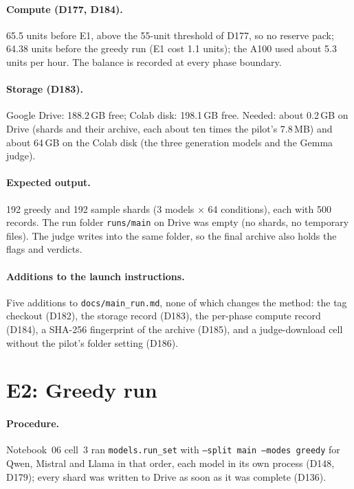 \documentclass[11pt,a4paper]{report}
\begin{document}
\paragraph{Compute (D177, D184).} 65.5 units before E1, above the 55-unit
threshold of D177, so no reserve pack; 64.38 units before the greedy run
(E1 cost 1.1 units); the A100 used about 5.3 units per hour. The balance is
recorded at every phase boundary.

\paragraph{Storage (D183).} Google Drive: 188.2\,GB free; Colab disk:
198.1\,GB free. Needed: about 0.2\,GB on Drive (shards and their archive,
each about ten times the pilot's 7.8\,MB) and about 64\,GB on the Colab disk
(the three generation models and the Gemma judge).

\paragraph{Expected output.} 192 greedy and 192 sample shards (3 models
$\times$ 64 conditions), each with 500 records. The run folder
\texttt{runs/main} on Drive was empty (no shards, no temporary files). The
judge writes into the same folder, so the final archive also holds the flags
and verdicts.

\paragraph{Additions to the launch instructions.} Five additions to
\texttt{docs/main\_run.md}, none of which changes the method: the tag
checkout (D182), the storage record (D183), the per-phase compute record
(D184), a SHA-256 fingerprint of the archive (D185), and a judge-download
cell without the pilot's folder setting (D186).


\section{E2: Greedy run}

\paragraph{Procedure.} Notebook~06 cell~3 ran \texttt{models.run\_set} with
\texttt{--split main --modes greedy} for Qwen, Mistral and Llama in that
order, each model in its own process (D148, D179); every shard was written
to Drive as soon as it was complete (D136).
\end{document}
